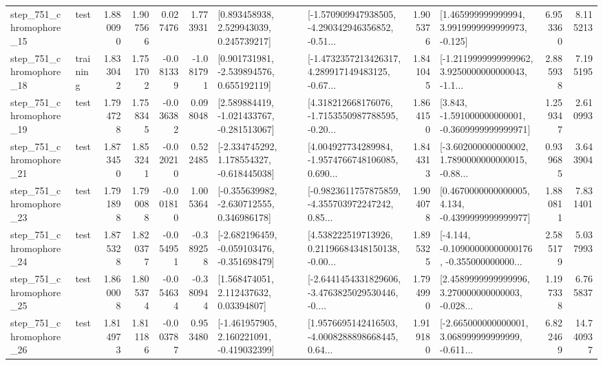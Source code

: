 \begin{tabular}{llrrrrllrlrr}
  step\_751\_chromophore\_15 &      test &      1.880090 &    1.907566 &      0.027476 &  1.773931 &     [0.893458938, 2.529943039, 0.245739217] &  [-1.570909947938505, -4.290342946356852, -0.51... &       1.905376 &    [1.465999999999994, 3.9919999999999973, -0.125] &            6.953360 &          8.115213 \\
  step\_751\_chromophore\_18 &  training &      1.833042 &    1.751702 &     -0.081339 & -1.081791 &    [0.901731981, -2.539894576, 0.655192119] &  [-1.4732357213426317, 4.289917149483125, -0.67... &       1.841045 &  [-1.2119999999999962, 3.9250000000000043, -1.1... &            2.885938 &          7.195195 \\
  step\_751\_chromophore\_19 &      test &      1.794728 &    1.758345 &     -0.036382 &  0.098048 &   [2.589884419, -1.021433767, -0.281513067] &  [4.318212668176076, -1.7153550987788595, -0.20... &       1.864150 &   [3.843, -1.591000000000001, -0.3609999999999971] &            1.259347 &          2.610993 \\
  step\_751\_chromophore\_21 &      test &      1.873450 &    1.853241 &     -0.020210 &  0.522485 &   [-2.334745292, 1.178554327, -0.618445038] &  [4.004927734289984, -1.9574766748106085, 0.690... &       1.844313 &  [-3.602000000000002, 1.7890000000000015, -0.88... &            0.939685 &          3.643904 \\
  step\_751\_chromophore\_23 &      test &      1.791898 &    1.790088 &     -0.001810 &  1.005364 &   [-0.355639982, -2.630712555, 0.346986178] &  [-0.9823611757875859, -4.355703972247242, 0.85... &       1.904078 &   [0.4670000000000005, 4.134, -0.4399999999999977] &            1.880811 &          7.831401 \\
  step\_751\_chromophore\_24 &      test &      1.875328 &    1.820377 &     -0.054951 & -0.389258 &  [-2.682196459, -0.059103476, -0.351698479] &  [4.538222519713926, 0.21196684348150138, -0.00... &       1.895325 &  [-4.144, -0.10900000000000176, -0.355000000000... &            2.585179 &          5.037993 \\
  step\_751\_chromophore\_25 &      test &      1.860008 &    1.805374 &     -0.054634 & -0.380944 &      [1.568474051, 2.112437632, 0.03394807] &  [-2.6441454331829606, -3.4763825029530446, -0.... &       1.794990 &  [2.4589999999999996, 3.270000000000003, -0.028... &            1.197338 &          6.765837 \\
  step\_751\_chromophore\_26 &      test &      1.814973 &    1.811186 &     -0.003787 &  0.953480 &   [-1.461957905, 2.160221091, -0.419032399] &  [1.9576695142416503, -4.0008288898668445, 0.64... &       1.919180 &  [-2.665000000000001, 3.068999999999999, -0.611... &            6.822469 &         14.740937 \\

\end{tabular}
